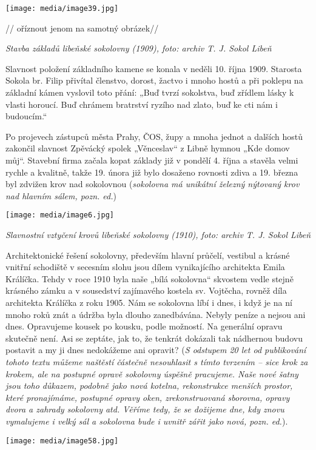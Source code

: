 \texttt{[image: media/image39.jpg]}

// oříznout jenom na samotný obrázek//

\emph{Stavba základů libeňské sokolovny (1909), foto: archiv T. J. Sokol
Libeň}

Slavnost položení základního kamene se konala v neděli 10. října 1909.
Starosta Sokola br. Filip přivítal členstvo, dorost, žactvo i mnoho
hostů a při poklepu na základní kámen vyslovil toto přání: „Buď tvrzí
sokolstva, buď zřídlem lásky k vlasti horoucí. Buď chrámem bratrství
ryzího nad zlato, buď ke cti nám i budoucím.``

Po projevech zástupců města Prahy, ČOS, župy a mnoha jednot a dalších
hostů zakončil slavnost Zpěvácký spolek „Věnceslav`` z Libně hymnou „Kde
domov můj``. Stavební firma začala kopat základy již v pondělí 4. října
a stavěla velmi rychle a kvalitně, takže 19. února již bylo dosaženo
rovnosti zdiva a 19. března byl zdvižen krov nad sokolovnou
(\emph{sokolovna má unikátní železný nýtovaný krov nad hlavním sálem,
pozn. ed.})

\texttt{[image: media/image6.jpg]}

\emph{Slavnostní vztyčení krovů libeňské sokolovny (1910), foto: archiv
T. J. Sokol Libeň}

Architektonické řešení sokolovny, především hlavní průčelí, vestibul a
krásné vnitřní schodiště v secesním slohu jsou dílem vynikajícího
architekta Emila Králíčka. Tehdy v roce 1910 byla naše „bílá sokolovna``
skvostem vedle stejně krásného zámku a v sousedství zajímavého kostela
sv. Vojtěcha, rovněž díla architekta Králíčka z roku 1905. Nám se
sokolovna líbí i dnes, i když je na ní mnoho roků znát a údržba byla
dlouho zanedbávána. Nebyly peníze a nejsou ani dnes. Opravujeme kousek
po kousku, podle možností. Na generální opravu skutečně není. Asi se
zeptáte, jak to, že tenkrát dokázali tak nádhernou budovu postavit a my
ji dnes nedokážeme ani opravit? (\emph{S odstupem 20 let od publikování
tohoto textu můžeme naštěstí částečně nesouhlasit s tímto tvrzením --
sice krok za krokem, ale na postupné opravě sokolovny úspěšně pracujeme.
Naše nové šatny jsou toho důkazem, podobně jako nová kotelna,
rekonstrukce menších prostor, které pronajímáme, postupné opravy oken,
zrekonstruovaná sborovna, opravy dvora a zahrady sokolovny atd. Věříme
tedy, že se dožijeme dne, kdy znovu vymalujeme i velký sál a sokolovna
bude i uvnitř zářit jako nová, pozn. ed.}).

\texttt{[image: media/image58.jpg]}

